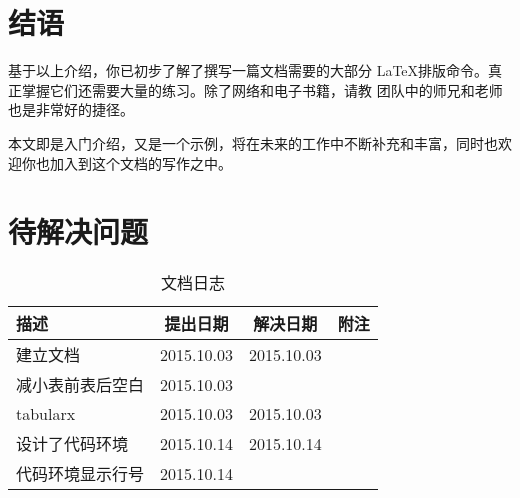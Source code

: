 \section{结语}

基于以上介绍，你已初步了解了撰写一篇文档需要的大部分
\LaTeX{}排版命令。真正掌握它们还需要大量的练习。除了网络和电子书籍，请教
团队中的师兄和老师也是非常好的捷径。

本文即是入门介绍，又是一个示例，将在未来的工作中不断补充和丰富，同时也欢
迎你也加入到这个文档的写作之中。

\section*{待解决问题}
\begin{table}[H] \centering
  \caption{文档日志}
  \label{tab:asdf}
  \begin{tabularx}{1.0\linewidth}{Xccc}
    \toprule
    描述 & 提出日期 & 解决日期 & 附注 \\
    \midrule
    建立文档         & 2015.10.03 & 2015.10.03 & \\
    减小表前表后空白 & 2015.10.03 & & \\
    tabularx         & 2015.10.03 & 2015.10.03 & \\
    设计了代码环境   & 2015.10.14 & 2015.10.14 & \\
    代码环境显示行号 & 2015.10.14 & & \\
    \bottomrule
  \end{tabularx}
\end{table}

